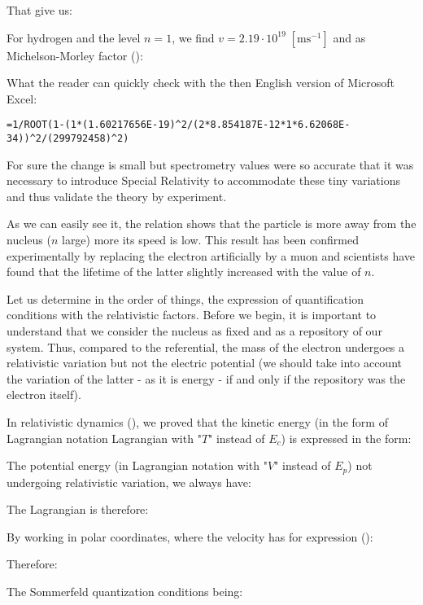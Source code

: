 	That give us:
	
	For hydrogen and the level $n=1$, we find $v=2.19\cdot 10^{19}\; [\text{m}\text{s}^{-1}]$ and as Michelson-Morley factor ():
	
	What the reader can quickly check with the then English version of Microsoft Excel:
	
	\texttt{=1/ROOT(1-(1*(1.60217656E-19)\string^2/(2*8.854187E-12*1*6.62068E-34))\string^2/(299792458)\string^2)}
	
	For sure the change is small but spectrometry values were so accurate that it was necessary to introduce Special Relativity to accommodate these tiny variations and thus validate the theory by experiment.
	\begin{tcolorbox}[title=Remark,colframe=black,arc=10pt]
	As we can easily see it, the relation shows that the particle is more away from the nucleus ($n$ large) more its speed is low. This result has been confirmed experimentally by replacing the electron artificially by a muon and scientists have found that the lifetime of the latter slightly increased with the value of $n$.
	\end{tcolorbox}
	Let us determine in the order of things, the expression of quantification conditions with the relativistic factors. Before we begin, it is important to understand that we consider the nucleus as fixed and as a repository of our system. Thus, compared to the referential, the mass of the electron undergoes a relativistic variation but not the electric potential (we should take into account the variation of the latter - as it is energy - if and only if the repository was the electron itself).
	
	In relativistic dynamics (), we proved that the kinetic energy (in the form of Lagrangian notation Lagrangian with "$T$" instead of $E_c$) is expressed in the form:
	
	The potential energy (in Lagrangian notation with "$V$" instead of $E_p$) not undergoing relativistic variation, we always have:
	
	The Lagrangian is therefore:
	
	By working in polar coordinates, where the velocity has for expression ():
	
	Therefore:
	
	The Sommerfeld quantization conditions being:
	
